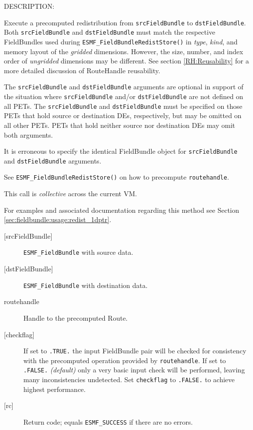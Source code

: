 {\sf DESCRIPTION:\\ }


   \begin{sloppypar}
   Execute a precomputed redistribution from {\tt srcFieldBundle}
   to {\tt dstFieldBundle}.
   Both {\tt srcFieldBundle} and {\tt dstFieldBundle} must match the
   respective FieldBundles used during {\tt ESMF\_FieldBundleRedistStore()}
   in {\em type}, {\em kind}, and memory layout of the {\em gridded}
   dimensions. However, the size, number,
   and index order of {\em ungridded} dimensions may be different. See section
   \ref{RH:Reusability} for a more detailed discussion of RouteHandle
   reusability.
   \end{sloppypar}
  
   The {\tt srcFieldBundle} and {\tt dstFieldBundle} arguments are optional in support of
   the situation where {\tt srcFieldBundle} and/or {\tt dstFieldBundle} are not defined on
   all PETs. The {\tt srcFieldBundle} and {\tt dstFieldBundle} must be specified on those
   PETs that hold source or destination DEs, respectively, but may be omitted
   on all other PETs. PETs that hold neither source nor destination DEs may
   omit both arguments.
  
   It is erroneous to specify the identical FieldBundle object for {\tt srcFieldBundle} and
   {\tt dstFieldBundle} arguments.
  
   See {\tt ESMF\_FieldBundleRedistStore()} on how to precompute
   {\tt routehandle}.
  
   This call is {\em collective} across the current VM.
  
   For examples and associated documentation regarding this method see Section
   \ref{sec:fieldbundle:usage:redist_1dptr}.
  
   \begin{description}
   \item [{[srcFieldBundle]}]
   {\tt ESMF\_FieldBundle} with source data.
   \item [{[dstFieldBundle]}]
   {\tt ESMF\_FieldBundle} with destination data.
   \item [routehandle]
   Handle to the precomputed Route.
   \item [{[checkflag]}]
   If set to {\tt .TRUE.} the input FieldBundle pair will be checked for
   consistency with the precomputed operation provided by {\tt routehandle}.
   If set to {\tt .FALSE.} {\em (default)} only a very basic input check
   will be performed, leaving many inconsistencies undetected. Set
   {\tt checkflag} to {\tt .FALSE.} to achieve highest performance.
   \item [{[rc]}]
   Return code; equals {\tt ESMF\_SUCCESS} if there are no errors.
   \end{description}
   
